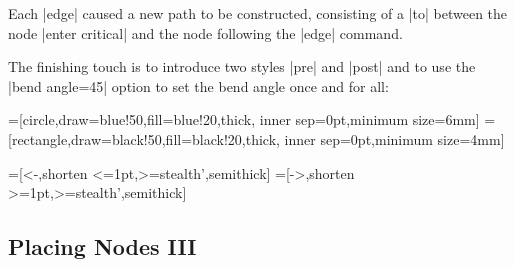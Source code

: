 Each |edge| caused a new path to be constructed, consisting of a |to|
between the node |enter critical| and the node following the |edge|
command.

The finishing touch is to introduce two styles |pre| and |post| and to
use the |bend angle=45| option to set the bend angle once and for all:

{
=[circle,draw=blue!50,fill=blue!20,thick,
                   inner sep=0pt,minimum size=6mm]
=[rectangle,draw=black!50,fill=black!20,thick,
                        inner sep=0pt,minimum size=4mm]
\begin{codeexample}[]
=[<-,shorten <=1pt,>=stealth',semithick]  
=[->,shorten >=1pt,>=stealth',semithick]  
\end{codeexample}
}


\subsection{Placing Nodes III}

